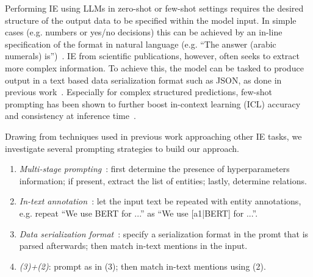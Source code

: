 
Performing IE using LLMs in zero-shot or few-shot settings requires the desired structure of the output data to be specified within the model input. In simple cases (e.g. numbers or yes/no decisions) this can be achieved by an in-line specification of the format in natural language (e.g. ``The answer (arabic numerals) is'')~\cite{Kojima2022}. IE from scientific publications, however, often seeks to extract more complex information. To achieve this, the model can be tasked to produce output in a text based data serialization format such as JSON, as done in previous work~\cite{Dunn2022}. Especially for complex structured predictions, few-shot prompting has been shown to further boost in-context learning (ICL) accuracy and consistency at inference time~\cite{Brown2020}.

Drawing from techniques used in previous work approaching other IE tasks, we investigate several prompting strategies to build our approach.
%
%

\begin{enumerate}
    \item \textit{Multi-stage prompting}~\cite{Polak2023}: first determine the presence of hyperparameters information; if present, extract the list of entities; lastly, determine relations.
    \item \textit{In-text annotation}~\cite{Wang2023}: let the input text be repeated with entity annotations, e.g. repeat ``We use BERT for ...'' as ``We use [a1|BERT] for ...''. %
    \item \textit{Data serialization format}~\cite{Dunn2022}: specify a serialization format in the promt that is parsed afterwards; then match in-text mentions in the input.
    \item \textit{(3)+(2)}: prompt as in (3); then match in-text mentions using (2).
\end{enumerate}

